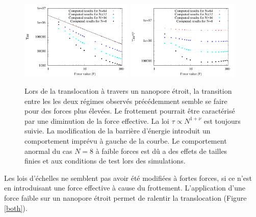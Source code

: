 \documentclass[a4paper,11pt]{article}
\begin{document}
\begin{figure}[H]
\begin{center}
\includegraphics[width=0.48\textwidth]{translocfthinpore.pdf} \includegraphics[width=0.48\textwidth]{translocthinpore.pdf}

\caption{Lors de la translocation à travers un nanopore étroit, la transition entre les les deux régimes observés précédemment semble se faire pour des forces plus élevées. Le frottement pourrait être caractérisé par une diminution de la force effective. La loi $\tau \propto N^{1+\nu}$ est toujours suivie. La modification de la barrière d'énergie introduit un comportement imprévu à gauche de la courbe. Le comportement anormal du cas $N=8$ à faible forces est dû a des effets de tailles finies et aux conditions de test lors des simulations.}
\label{thinpore}
\end{center}
\end{figure}

Les lois d'échelles ne semblent pas avoir été modifiées à fortes forces, si ce n'est en introduisant une force effective à cause du frottement. L'application d'une force faible sur un nanopore étroit permet de ralentir la translocation (Figure \ref{both}).
\end{document}
